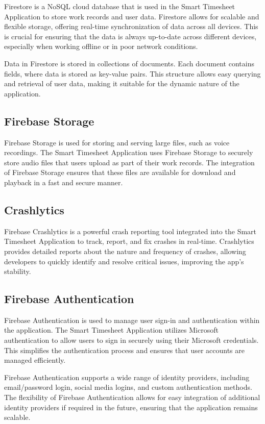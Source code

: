 \documentclass[
  digital,     %
  oneside,     %
  nosansbold,  %
  nocolorbold, %
  lof,         %
  lot,         %
]{fithesis4}
\begin{document}
Firestore is a NoSQL cloud database that is used in the Smart Timesheet Application to store work records and user data. Firestore allows for scalable and flexible storage, offering real-time synchronization of data across all devices. This is crucial for ensuring that the data is always up-to-date across different devices, especially when working offline or in poor network conditions.

Data in Firestore is stored in collections of documents. Each document contains fields, where data is stored as key-value pairs. This structure allows easy querying and retrieval of user data, making it suitable for the dynamic nature of the application.

\subsection{Firebase Storage}

Firebase Storage is used for storing and serving large files, such as voice recordings. The Smart Timesheet Application uses Firebase Storage to securely store audio files that users upload as part of their work records. The integration of Firebase Storage ensures that these files are available for download and playback in a fast and secure manner.

\subsection{Crashlytics}

Firebase Crashlytics is a powerful crash reporting tool integrated into the Smart Timesheet Application to track, report, and fix crashes in real-time. Crashlytics provides detailed reports about the nature and frequency of crashes, allowing developers to quickly identify and resolve critical issues, improving the app's stability.

\subsection{Firebase Authentication}

Firebase Authentication is used to manage user sign-in and authentication within the application. The Smart Timesheet Application utilizes Microsoft authentication to allow users to sign in securely using their Microsoft credentials. This simplifies the authentication process and ensures that user accounts are managed efficiently.

Firebase Authentication supports a wide range of identity providers, including email/password login, social media logins, and custom authentication methods. The flexibility of Firebase Authentication allows for easy integration of additional identity providers if required in the future, ensuring that the application remains scalable.
\end{document}
